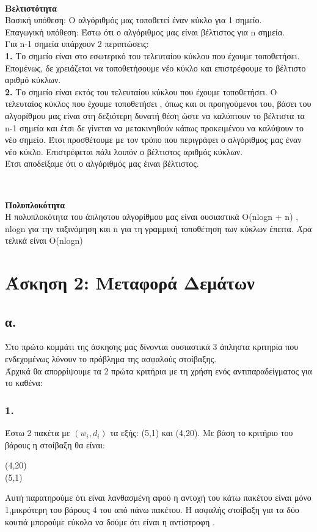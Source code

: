 \documentclass[12pt,a4paper]{article}
\begin{document}
\begin{center}
    \\
\end{center}
\textbf{Βελτιστότητα}\\
Βασική υπόθεση: Ο αλγόριθμός μας τοποθετεί έναν κύκλο για 1 σημείο. \\
Επαγωγική υπόθεση: Έστω ότι ο αλγόριθμος μας είναι βέλτιστος για n σημεία. \\
Για n-1 σημεία υπάρχουν 2 περιπτώσεις: \\
\textbf{1.} Το σημείο είναι στο εσωτερικό του τελευταίου κύκλου που έχουμε τοποθετήσει. Επομένως, δε χρειάζεται να τοποθετήσουμε νέο κύκλο και επιστρέφουμε το βέλτιστο αριθμό κύκλων. \\
\textbf{2.} Το σημείο είναι εκτός του τελευταίου κύκλου που έχουμε τοποθετήσει. Ο τελευταίος κύκλος που έχουμε τοποθετήσει , όπως και οι προηγούμενοι του, βάσει του αλγορίθμου μας είναι στη δεξιότερη δυνατή θέση ώστε να καλύπτουν το βέλτιστα τα n-1 σημεία και έτσι δε γίνεται να μετακινηθούν κάπως προκειμένου να καλύψουν το νέο σημείο. Έτσι προσθέτουμε με τον τρόπο που περιγράφει ο αλγόριθμος μας έναν νέο κύκλο. Επιστρέφεται πάλι λοιπόν ο βέλτιστος αριθμός κύκλων. \\
Έτσι αποδείξαμε ότι ο αλγόριθμός μας έιναι βέλτιστος.\\
\begin{center}
    \\
\end{center}
\textbf{Πολυπλοκότητα} \\
Η πολυπλοκότητα του άπληστου αλγορίθμου μας είναι ουσιαστικά O(nlogn + n) , nlogn για την ταξινόμηση και n για τη γραμμική τοποθέτηση των κύκλων έπειτα. Άρα τελικά είναι O(n\cdot logn)


\section*{Άσκηση 2: Μεταφορά Δεμάτων }
\subsection*{α.}
Στο πρώτο κομμάτι της άσκησης μας δίνονται ουσιαστικά 3 άπληστα κριτηρία που ενδεχομένως λύνουν το πρόβλημα της ασφαλούς στοίβαξης. \\
Άρχικά θα απορρίψουμε τα 2 πρώτα κριτήρια με τη χρήση ενός αντιπαραδείγματος για το καθένα:
\subsubsection*{1.} Έστω 2 πακέτα με $(w_{i},d_{i})$ τα εξής: (5,1) και (4,20). Με βάση το κριτήριο του βάρους η στοίβαξη θα είναι: 
\begin{center}
    (4,20) \\
    (5,1) 
\end{center}
Αυτή παρατηρούμε ότι είναι λανθασμένη αφού η αντοχή του κάτω πακέτου είναι μόνο 1,μικρότερη του βάρους 4 του από πάνω πακέτου. Η ασφαλής στοίβαξη για τα δύο κουτιά μπορούμε εύκολα να δούμε ότι είναι η αντίστροφη . 
\end{document}
